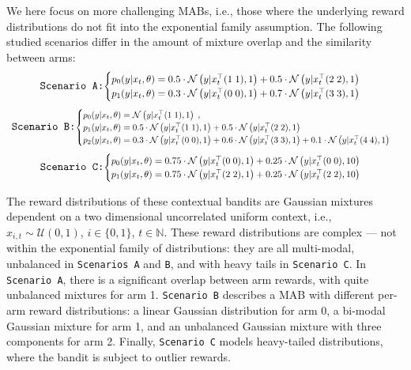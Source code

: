 \documentclass{article}
\def \Natural{{\mathbb N}}
\newcommand{\ie}{i.e., }
\newcommand{\N}[1]{\mathcal{N}\left( #1\right)}
\newcommand{\U}[1]{\mathcal{U}\left( #1\right)}
\begin{document}
We here focus on more challenging MABs, \ie those where the underlying reward distributions do not fit into the exponential family assumption. The following studied scenarios differ in the amount of mixture overlap and the similarity between arms:
\begin{equation}
\texttt{Scenario A:}\\
\resizebox{0.7\textwidth}{!}{$
\begin{cases}
p_{0}(y|x_t,\theta) = 0.5 \cdot \N{y|x_t^\top (1 \; 1), 1} + 0.5 \cdot \N{y|x_t^\top (2 \; 2), 1}\\
p_{1}(y|x_t,\theta) = 0.3 \cdot \N{y|x_t^\top (0 \; 0), 1} + 0.7 \cdot \N{y|x_t^\top (3 \; 3), 1}
\end{cases}
$}
\nonumber
\end{equation}
\vspace*{-2ex}
\begin{equation}
\texttt{Scenario B:}\\
\resizebox{0.85\textwidth}{!}{$
\begin{cases}
p_{0}(y|x_t,\theta) = \N{y|x_t^\top (1 \; 1), 1}\; ,\\
p_{1}(y|x_t,\theta) = 0.5 \cdot \N{y|x_t^\top (1 \; 1), 1} + 0.5 \cdot \N{y|x_t^\top (2 \; 2), 1}\\
p_{2}(y|x_t,\theta) = 0.3 \cdot \N{y|x_t^\top (0 \; 0), 1} + 0.6 \cdot \N{y|x_t^\top (3 \; 3), 1} + 0.1 \cdot \N{y|x_t^\top (4 \; 4), 1} 
\end{cases}
$}
\nonumber
\end{equation}
\begin{equation}
\texttt{Scenario C:}\\
\resizebox{0.7\textwidth}{!}{$
\begin{cases}
p_{0}(y|x_t,\theta) = 0.75 \cdot \N{y|x_t^\top (0 \; 0), 1} + 0.25 \cdot \N{y|x_t^\top (0 \; 0), 10} \\
p_{1}(y|x_t,\theta) = 0.75 \cdot \N{y|x_t^\top (2 \; 2), 1} + 0.25 \cdot \N{y|x_t^\top (2 \; 2), 10}
\end{cases}
$}
\nonumber
\end{equation}

The reward distributions of these contextual bandits are Gaussian mixtures dependent on a two dimensional uncorrelated uniform context, \ie $x_{i,t}\sim\U{0,1}$, $i\in\{0,1\}$, $t\in \Natural$. These reward distributions are complex --- not within the exponential family of distributions: they are all multi-modal, unbalanced in \texttt{Scenarios A} and \texttt{B}, and with heavy tails in \texttt{Scenario C}. In \texttt{Scenario A}, there is a significant overlap between arm rewards, with quite unbalanced mixtures for arm 1. \texttt{Scenario B} describes a MAB with different per-arm reward distributions: a linear Gaussian distribution for arm 0, a bi-modal Gaussian mixture for arm 1, and an unbalanced Gaussian mixture with three components for arm 2. Finally, \texttt{Scenario C} models heavy-tailed distributions, where the bandit is subject to outlier rewards.
\end{document}

